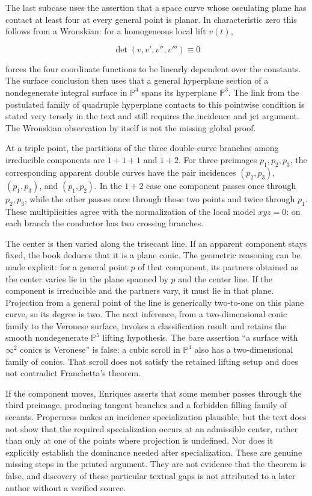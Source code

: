 The last subcase uses the assertion that a space curve whose osculating plane has contact at least four at every general point is planar. In characteristic zero this follows from a Wronskian: for a homogeneous local lift \(v(t)\),

\[
\det(v,v',v'',v''')\equiv0
\]

forces the four coordinate functions to be linearly dependent over the constants. The surface conclusion then uses that a general hyperplane section of a nondegenerate integral surface in \(\mathbb P^4\) spans its hyperplane \(\mathbb P^3\). The link from the postulated family of quadruple hyperplane contacts to this pointwise condition is stated very tersely in the text and still requires the incidence and jet argument. The Wronskian observation by itself is not the missing global proof.

At a triple point, the partitions of the three double-curve branches among irreducible components are \(1+1+1\) and \(1+2\). For three preimages \(p_1,p_2,p_3\), the corresponding apparent double curves have the pair incidences \((p_2,p_3)\), \((p_1,p_3)\), and \((p_1,p_2)\). In the \(1+2\) case one component passes once through \(p_2,p_3\), while the other passes once through those two points and twice through \(p_1\). These multiplicities agree with the normalization of the local model \(xyz=0\): on each branch the conductor has two crossing branches.

The center is then varied along the trisecant line. If an apparent component stays fixed, the book deduces that it is a plane conic. The geometric reasoning can be made explicit: for a general point \(p\) of that component, its partners obtained as the center varies lie in the plane spanned by \(p\) and the center line. If the component is irreducible and the partners vary, it must lie in that plane. Projection from a general point of the line is generically two-to-one on this plane curve, so its degree is two. The next inference, from a two-dimensional conic family to the Veronese surface, invokes a classification result and retains the smooth nondegenerate \(\mathbb P^5\) lifting hypothesis. The bare assertion ``a surface with \(\infty^2\) conics is Veronese'' is false: a cubic scroll in \(\mathbb P^4\) also has a two-dimensional family of conics. That scroll does not satisfy the retained lifting setup and does not contradict Franchetta's theorem.

If the component moves, Enriques asserts that some member passes through the third preimage, producing tangent branches and a forbidden filling family of secants. Properness makes an incidence specialization plausible, but the text does not show that the required specialization occurs at an admissible center, rather than only at one of the points where projection is undefined. Nor does it explicitly establish the dominance needed after specialization. These are genuine missing steps in the printed argument. They are not evidence that the theorem is false, and discovery of these particular textual gaps is not attributed to a later author without a verified source.

